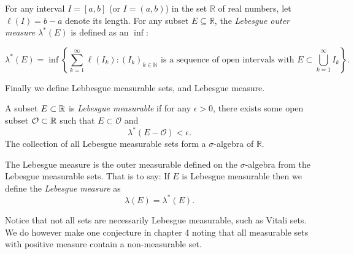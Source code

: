 \begin{definition}
    For any interval $I = [a,b]$ (or $I = (a, b)$) in the set $\mathbb{R}$ of real numbers, let $\ell(I)= b - a$ denote its length. For any subset $E\subseteq\mathbb{R}$, the \textit{Lebesgue outer measure} $\lambda^*(E)$ is defined as an $\inf:$ 
    
    $$\lambda^*(E) = \inf \left\{\sum_{k=1}^\infty \ell(I_k) : {(I_k)_{k \in \mathbb N}} \text{ is a sequence of open intervals with } E\subset \bigcup_{k=1}^\infty I_k\right\}.$$
\end{definition}

Finally we define Lebbesgue measurable sets, and Lebesgue measure.  
\begin{definition}
    A subset $E\subset \mathbb{R}$ is \textit{Lebesgue measurable} if for any $\epsilon > 0$, there exists some open subset $\mathcal{O}\subset \mathbb{R}$ such that 
    $E\subset \mathcal{O}$ and 
    $$\lambda^*(E - \mathcal{O}) < \epsilon. $$
    The collection of all Lebesgue measurable sets form a $\sigma$-algebra of ${\mathbb R}$. 
\end{definition}
\begin{definition}
    The Lebesgue measure is the outer measurable defined on the $\sigma$-algebra from the Lebesgue measurable sets. That is to say:
    If $E$ is Lebesgue measurable then we define the \textit{Lebesgue measure} as 
    $$\lambda(E) = \lambda^*(E).$$
\end{definition}

Notice that not all sets are necessarily Lebesgue measurable, such as Vitali sets.  We do however make one conjecture in chapter 4 noting that all measurable sets with positive measure contain a non-measurable set.  





